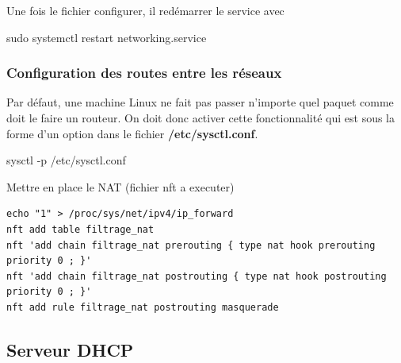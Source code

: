 \documentclass{article}
\begin{document}
Une fois le fichier configurer, il redémarrer le service avec 
\begin{command}
sudo systemctl restart networking.service
\end{command}
\subsubsection{Configuration des routes entre les réseaux}

Par défaut, une machine Linux ne fait pas passer n'importe quel paquet comme doit le faire un routeur. On doit donc activer cette fonctionnalité qui est sous la forme d'un option dans le fichier \textbf{/etc/sysctl.conf}.


\begin{command}
    sysctl -p /etc/sysctl.conf
\end{command}

Mettre en place le NAT (fichier nft a executer) 
\begin{verbatim}
echo "1" > /proc/sys/net/ipv4/ip_forward
nft add table filtrage_nat
nft 'add chain filtrage_nat prerouting { type nat hook prerouting priority 0 ; }'
nft 'add chain filtrage_nat postrouting { type nat hook postrouting priority 0 ; }'
nft add rule filtrage_nat postrouting masquerade
\end{verbatim}

\subsection{Serveur DHCP}
\end{document}
